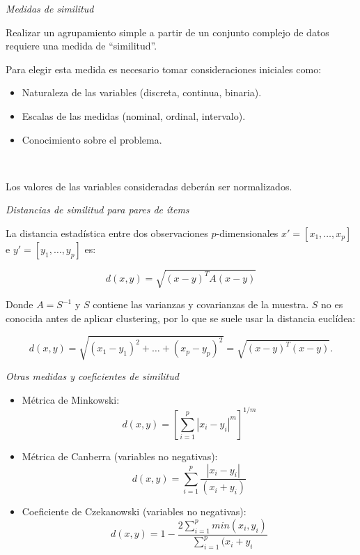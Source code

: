 \documentclass[spanish]{beamer}
\begin{document}
\begin{frame}{\textit{Medidas de similitud}}

Realizar un agrupamiento simple a partir de un conjunto complejo de datos requiere una medida de ``similitud''.\break

Para elegir esta medida es necesario tomar consideraciones iniciales como:

\begin{itemize}
\item Naturaleza de las variables (discreta, continua, binaria).
\item Escalas de las medidas (nominal, ordinal, intervalo).
\item Conocimiento sobre el problema.
\end{itemize}\

Los valores de las variables consideradas deberán ser normalizados.
\end{frame}

\begin{frame}{\textit{Distancias de similitud para pares de ítems}}

La distancia estadística entre dos observaciones $p$-dimensionales $x' = [x_1,\dots,x_p]$ e $y'=[y_1,\dots,y_p]$ es:

$$d(x,y)=\sqrt{(x-y)^TA(x-y)} $$

Donde $A=S^{-1}$ y $S$ contiene las varianzas y covarianzas de la muestra.
$S$ no es conocida antes de aplicar clustering, por lo que se suele usar la distancia euclídea:

$$d(x,y) = \sqrt{(x_1-y_1)^2+\dots+(x_p-y_p)^2}=\sqrt{(x-y)^T(x-y)}.$$
\end{frame}

\begin{frame}{\textit{Otras medidas y coeficientes de similitud}}

\begin{itemize}
\item Métrica de Minkowski:
$$ d(x,y)=\left  [\sum_{i=1}^{p}{|x_i-y_i|^m} \right ]^{1/m}$$
\item Métrica de Canberra (variables no negativas):
$$d(x,y)=\sum_{i=1}^{p}{\frac{|x_i-y_i|}{(x_i+y_i)}}$$
\item Coeficiente de Czekanowski (variables no negativas):
$$d(x,y)=1-\frac{2\sum_{i=1}^{p}{min(x_i,y_i)}}{\sum_{i=1}^{p}{(x_i+y_i}}$$
\end{itemize}
\end{frame}
\end{document}
